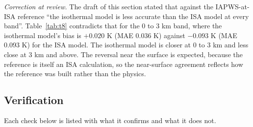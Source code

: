 \documentclass[11pt,letterpaper]{article}
\begin{document}
\emph{Correction at review.} The draft of this section stated that against the IAPWS-at-ISA reference ``the isothermal model is less accurate than the ISA model at every band''. Table~\ref{tab:t8} contradicts that for the 0 to 3 km band, where the isothermal model's bias is $+0.020$ K (MAE 0.036 K) against $-0.093$ K (MAE 0.093 K) for the ISA model. The isothermal model is closer at 0 to 3 km and less close at 3 km and above. The reversal near the surface is expected, because the reference is itself an ISA calculation, so the near-surface agreement reflects how the reference was built rather than the physics.

\subsection{Verification}

Each check below is listed with what it confirms and what it does not.
\end{document}
